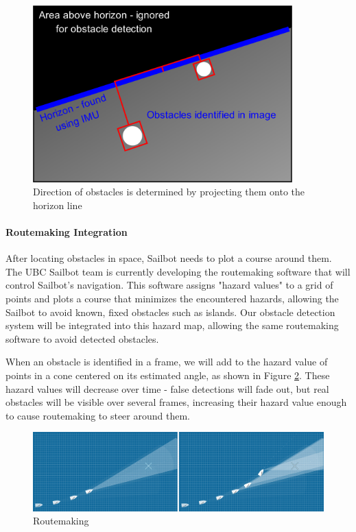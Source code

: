 \begin{figure}
\includegraphics[width=100mm,natwidth=1203,natheight=627]{"./image/horizon_finding"}
\caption[UBC Sailbot.]{\label{fig:horizon-finding}Direction of obstacles is determined by projecting them onto the horizon line}
\end{figure}

\paragraph{\label{sec:discussion:equipment:architecture:routemaking}Routemaking Integration}
After locating obstacles in space, Sailbot needs to plot a course around them.  The UBC Sailbot team is currently developing the routemaking software that will control Sailbot's navigation.  This software assigns "hazard values" to a grid of points and plots a course that minimizes the encountered hazards, allowing the Sailbot to avoid known, fixed obstacles such as islands.  Our obstacle detection system will be integrated into this hazard map, allowing the same routemaking software to avoid detected obstacles.

When an obstacle is identified in a frame, we will add to the hazard value of points in a cone centered on its estimated angle, as shown in Figure \ref{fig:routemaking}.  These hazard values will decrease over time - false detections will fade out, but real obstacles will be visible over several frames, increasing their hazard value enough to cause routemaking to steer around them.

\begin{figure}
\includegraphics[width=160mm,natwidth=1203,natheight=627]{"./image/routemaking"}
\caption[UBC Sailbot.]{\label{fig:routemaking}Routemaking}
\end{figure}